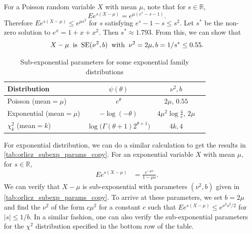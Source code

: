\documentclass[ejs,noshowframe]{imsart}
\theoremstyle{plain}
\theoremstyle{definition}
\newcommand{\R}{\mathbb{R}}
\newcommand{\E}{E}
\begin{document}
\begin{appendix}
For a Poisson random variable $X$ with mean $\mu$, note that for $s\in \R$,
\begin{equation*}
\E e^{s(X-\mu)} = e^{\mu(e^s-s-1)}.
\end{equation*}
Therefore $ \E e^{s(X-\mu)} \leq e^{\mu s^2}$ for $s$ satisfying $e^s- 1 - s 
\leq  s^2$. Let $s^*$ be the  non-zero solution to $e^x = 1+x+x^2$. Then 
$s^*\approx 1.793$.
From this, we can show that
$$
X-\mu \;\;{\rm is}\;\; {\rm SE}(\nu^2, b) \;\;{\rm with }\;\;  \nu^2=2\mu, 
b=1/s^* \leq 0.55.
$$


\begin{table}[t]
    \caption{\label{tab:orlicz_subexp_params_copy} Sub-exponential parameters 
		for some exponential family distributions}
  \centering
  \begin{tabular}{lccc}
    \toprule
    Distribution & $\psi(\theta)$ 
    & $\nu^2, b$\\
    \midrule
    Poisson (mean$=\mu$) & $e^\theta$ 
    & $2\mu$, \; $0.55$ \\ 
    Exponential (mean$=\mu$) & $-\log(-\theta)$ 
    & $4\mu^2\log\frac{4}{e} $,\; $2\mu$ \\
    $\chi^2_k$ (mean$=k$) & $\log \big(\Gamma(\theta+1) 2^{\theta+1}\big)$ 
     & $4k, 4$ \\
\bottomrule
\end{tabular}
\end{table}

For exponential distribution, we can do a similar calculation to get the results
in \autoref{tab:orlicz_subexp_params_copy}.
For an exponential variable $X$ with mean $\mu$, for $s\in \R,$
\begin{align}
\E e^{s (X-\mu)} &=  \frac{e^{-\mu s}}{1-\mu s}.
\end{align}
We can verify 
that $X-\mu$ is sub-exponential with parameters $(\nu^2,b)$ given in 
\autoref{tab:orlicz_subexp_params_copy}. To arrive at these parameters, we set 
$b=2\mu$ and find the $\nu^2$ of
the form $c\mu^2$ for a constant $c$ such that $\E e^{s(X-\mu)} \leq e^{\nu^2 
s^2/2}$ for $|s| \leq 1/b$.
In a similar fashion, one can also verify the sub-exponential 
parameters for the $\chi^2$ distribution specified in the bottom row of the 
table.


\end{appendix}
\end{document}
